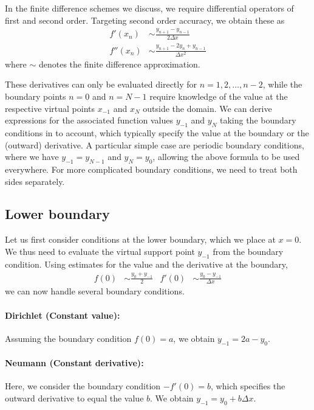 \documentclass[
	superscriptaddress,
	twocolumn,
	aps, pre
]{revtex4-1}
\newcommand{\dx}{\Delta x}
\begin{document}
In the finite difference schemes we discuss, we require differential operators of first and second order.
Targeting second order accuracy, we obtain these as 
\begin{subequations}
\begin{align}
	f'(x_n) &\sim \frac{y_{n+1} - y_{n-1}}{2\dx}
\\	
	f''(x_n) &\sim \frac{y_{n+1} - 2 y_n + y_{n-1}}{\dx^2}
\end{align}
\end{subequations}
where $\sim$ denotes the finite difference approximation.

These derivatives can only be evaluated directly for $n=1,2,\ldots, n-2$, while the boundary points $n=0$ and $n=N-1$ require knowledge of the value at the respective virtual points $x_{-1}$ and $x_N$ outside the domain.
We can derive expressions for the associated function values $y_{-1}$ and $y_N$  taking the boundary conditions in to account, which typically specify the value at the boundary or the (outward) derivative.
A particular simple case are periodic boundary conditions, where we have $y_{-1} = y_{N-1}$ and $y_N = y_0$, allowing the above formula to be used everywhere.
For more complicated boundary conditions, we need to treat both sides separately.

\subsection{Lower boundary}
Let us first consider conditions at the lower boundary, which we place at $x=0$.
We thus need to evaluate the virtual support point $y_{-1}$ from the boundary condition.
Using estimates for the value and the derivative at the boundary,
\begin{align}
	f(0) &\sim \frac{y_0 + y_{-1}}{2}
&
	f'(0) &\sim \frac{y_0 - y_{-1}}{\dx}
\end{align}
we can now handle several boundary conditions.

\paragraph{Dirichlet (Constant value):}
Assuming the boundary condition $f(0) = a$, we obtain $y_{-1} = 2a - y_0$.

\paragraph{Neumann (Constant derivative):}
Here, we consider the boundary condition $-f'(0) = b$, which specifies the outward derivative to equal the value $b$.
We obtain $y_{-1} = y_0 + b \dx$.
\end{document}
